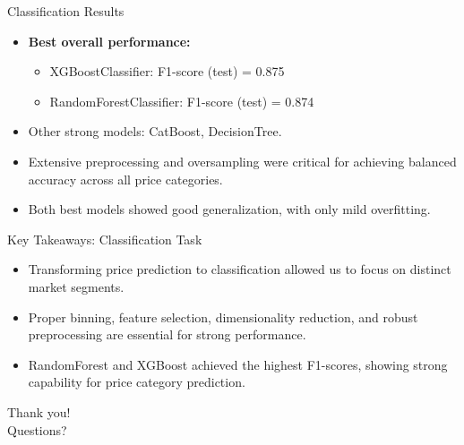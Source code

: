 \documentclass{beamer}
\begin{document}
\begin{frame}{Classification Results}
    \begin{itemize}
        \item \textbf{Best overall performance:}
        \begin{itemize}
            \item XGBoostClassifier: F1-score (test) = 0.875
            \item RandomForestClassifier: F1-score (test) = 0.874
        \end{itemize}
        \item Other strong models: CatBoost, DecisionTree.
        \item Extensive preprocessing and oversampling were critical for achieving balanced accuracy across all price categories.
        \item Both best models showed good generalization, with only mild overfitting.
    \end{itemize}
\end{frame}


\begin{frame}{Key Takeaways: Classification Task}
    \begin{itemize}
        \item Transforming price prediction to classification allowed us to focus on distinct market segments.
        \item Proper binning, feature selection, dimensionality reduction, and robust preprocessing are essential for strong performance.
        \item RandomForest and XGBoost achieved the highest F1-scores, showing strong capability for price category prediction.
    \end{itemize}
\end{frame}

\begin{frame}
    \centering
    \Huge
    Thank you! \\
    Questions?
\end{frame}
\end{document}
